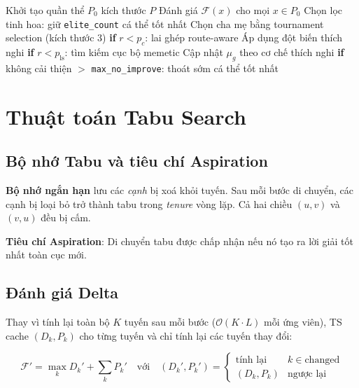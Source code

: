 \documentclass[12pt, a4paper]{article}
\newcommand{\fitfunc}{\mathcal{F}}
\begin{document}
\begin{algorithm}[H]
\caption{Memetic Genetic Algorithm}
\begin{algorithmic}[1]
\State Khởi tạo quần thể $P_0$ kích thước $P$
\State Đánh giá $\fitfunc(x)$ cho mọi $x \in P_0$
  \State Chọn lọc tinh hoa: giữ \texttt{elite\_count} cá thể tốt nhất
    \State Chọn cha mẹ bằng tournament selection (kích thước 3)
    \State \textbf{if} $r < p_c$: lai ghép route-aware
    \State Áp dụng đột biến thích nghi
    \State \textbf{if} $r < p_{\text{ls}}$: tìm kiếm cục bộ memetic
  \EndWhile
  \State Cập nhật $\mu_g$ theo cơ chế thích nghi
  \State \textbf{if} không cải thiện $> $ \texttt{max\_no\_improve}: thoát sớm
\EndFor
\State \Return cá thể tốt nhất
\end{algorithmic}
\end{algorithm}

\section{Thuật toán Tabu Search}

\subsection{Bộ nhớ Tabu và tiêu chí Aspiration}

\textbf{Bộ nhớ ngắn hạn} lưu các \emph{cạnh} bị xoá khỏi tuyến. Sau mỗi bước di chuyển, các cạnh bị loại bỏ trở thành tabu trong \textit{tenure} vòng lặp. Cả hai chiều $(u,v)$ và $(v,u)$ đều bị cấm.

\textbf{Tiêu chí Aspiration}: Di chuyển tabu được chấp nhận nếu nó tạo ra lời giải tốt nhất toàn cục mới.

\subsection{Đánh giá Delta}

Thay vì tính lại toàn bộ $K$ tuyến sau mỗi bước ($\mathcal{O}(K \cdot L)$ mỗi ứng viên), TS cache $(D_k, P_k)$ cho từng tuyến và chỉ tính lại các tuyến thay đổi:

\begin{equation}
  \fitfunc' = \max_k D_k' + \sum_k P_k'
  \quad\text{với}\quad
  (D_k', P_k') = \begin{cases}
    \text{tính lại} & k \in \text{changed} \\
    (D_k, P_k)      & \text{ngược lại}
  \end{cases}
\end{equation}
\end{document}
